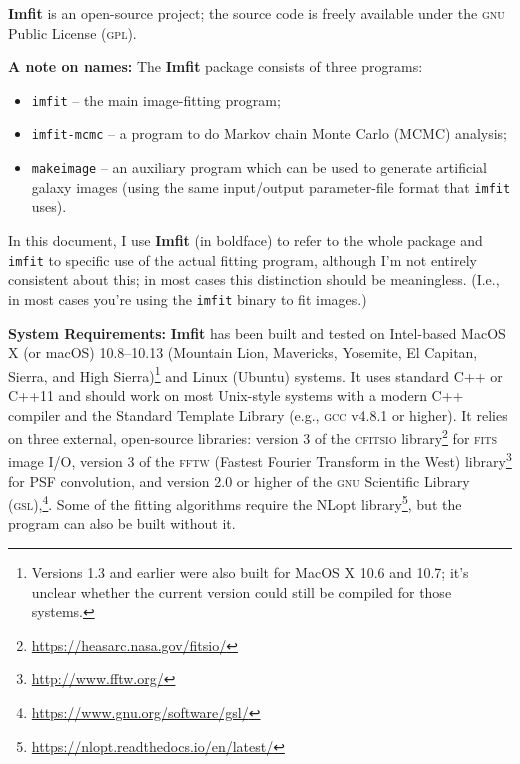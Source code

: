 \documentclass[10pt,a4paper,article]{memoir}
\newcommand{\imfit}{\textbf{Imfit}}
\newcommand{\Imfit}{\textbf{Imfit}}
\newcommand{\imfitprog}{\texttt{imfit}}
\newcommand{\imfitmcmc}{\texttt{imfit-mcmc}}
\newcommand{\makeimage}{\texttt{makeimage}}
\begin{document}
\Imfit{} is an open-source project; the source code is freely available
under the \textsc{gnu} Public License (\textsc{gpl}).


\bigskip

\textbf{A note on names:} The \imfit{} package consists of three programs:
\begin{itemize}
\item \imfitprog{} -- the main image-fitting program; \\
\item \imfitmcmc{} -- a program to do Markov chain Monte Carlo (MCMC) analysis; \\
\item \makeimage{} -- an auxiliary program which can be used to
generate artificial galaxy images (using the same input/output
parameter-file format that \imfitprog{} uses). \\
\end{itemize}
In this document, I use \imfit{} (in boldface) to refer to the whole
package and \imfitprog{} to specific use of the actual fitting program,
although I'm not entirely consistent about this; in most cases this
distinction should be meaningless. (I.e., in most cases you're using the
\imfitprog{} binary to fit images.)


\bigskip

\textbf{System Requirements:} \Imfit{} has been built and tested on
Intel-based MacOS X (or macOS) 10.8--10.13 (Mountain Lion, Mavericks,
Yosemite, El Capitan, Sierra, and High Sierra)\footnote{Versions 1.3 and earlier were
also built for MacOS X 10.6 and 10.7; it's unclear whether the current
version could still be compiled for those systems.} and Linux (Ubuntu)
systems. It uses standard C++ or C++11 and should work on most
Unix-style systems with a modern C++ compiler and the Standard Template
Library (e.g., \textsc{gcc} v4.8.1 or higher). It relies on three
external, open-source libraries: version 3 of the \textsc{cfitsio}
library\footnote{\url{https://heasarc.nasa.gov/fitsio/}} for
\textsc{fits} image I/O, version 3 of the \textsc{fftw} (Fastest Fourier
Transform in the West) library\footnote{\url{http://www.fftw.org/}} for
PSF convolution, and version 2.0 or higher of the \textsc{gnu}
Scientific Library
(\textsc{gsl}),\footnote{\url{https://www.gnu.org/software/gsl/}}. Some
of the fitting algorithms require the NLopt
library\footnote{\url{https://nlopt.readthedocs.io/en/latest/}}, but the
program can also be built without it.

\bigskip
\end{document}
